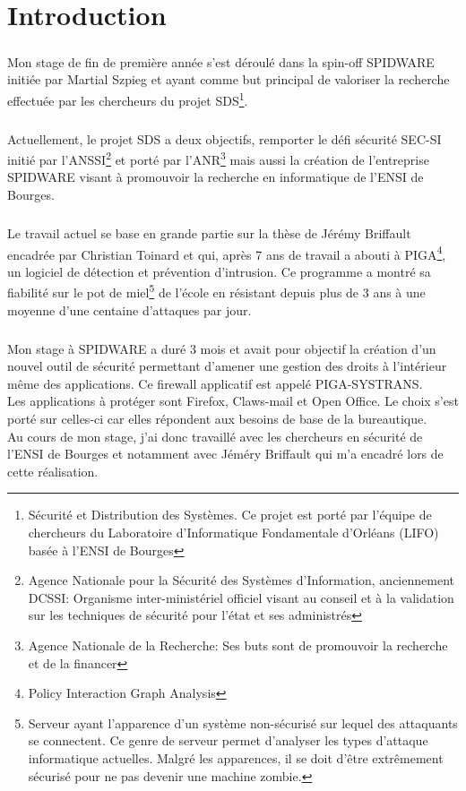 \chapter*{Introduction}
	\paragraph*{}
		Mon stage de fin de première année s'est déroulé dans la spin-off SPIDWARE initiée par Martial Szpieg et ayant comme but principal de valoriser la recherche effectuée par les chercheurs du projet SDS\footnote{Sécurité et Distribution des Systèmes. Ce projet est porté par l'équipe de chercheurs du Laboratoire d'Informatique Fondamentale d'Orléans (LIFO) basée à l'ENSI de Bourges}.
	
	\paragraph*{}
		Actuellement, le projet SDS	a deux objectifs, remporter le défi sécurité SEC-SI initié par l'ANSSI\footnote{Agence Nationale pour la Sécurité des Systèmes d'Information, anciennement DCSSI: Organisme inter-ministériel officiel visant au conseil et à la validation sur les techniques de sécurité pour l'état et ses administrés} et porté par l'ANR\footnote{Agence Nationale de la Recherche: Ses buts sont de promouvoir la recherche et de la financer} mais aussi la création de l'entreprise SPIDWARE visant à promouvoir la recherche en informatique de l'ENSI de Bourges.
		
	\paragraph*{}
		Le travail actuel se base en grande partie sur la thèse de Jérémy Briffault encadrée par Christian Toinard et qui, après 7 ans de travail a abouti à PIGA\footnote{Policy Interaction Graph Analysis}, un logiciel de détection et prévention d'intrusion. Ce programme a montré sa fiabilité sur le pot de miel\footnote{Serveur ayant l'apparence d'un système non-sécurisé sur lequel des attaquants se connectent. Ce genre de serveur permet d'analyser les types d'attaque informatique actuelles. Malgré les apparences, il se doit d'être extrêmement sécurisé pour ne pas devenir une machine zombie.} de l'école en résistant depuis plus de 3 ans à une moyenne d'une centaine d'attaques par jour. 
	
	\paragraph*{}
		Mon stage à SPIDWARE a duré 3 mois et avait pour objectif la création d'un nouvel outil de sécurité permettant d'amener une gestion des droits à l'intérieur même des applications. Ce firewall applicatif est appelé PIGA-SYSTRANS.\\
		Les applications à protéger sont Firefox, Claws-mail et Open Office. Le choix s'est porté sur celles-ci car elles répondent aux besoins de base de la bureautique.\\
		Au cours de mon stage, j'ai donc travaillé avec les chercheurs en sécurité de l'ENSI de Bourges et notamment avec Jéméry Briffault qui m'a encadré lors de cette réalisation.
	
